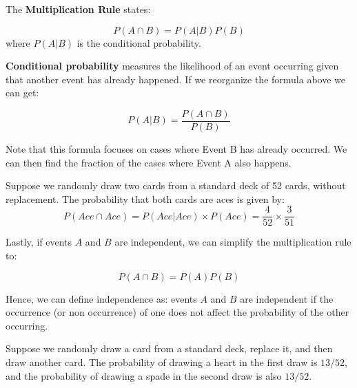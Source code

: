 \documentclass[
  11pt,
  letterpaper,
  DIV=11,
  numbers=noendperiod,
  oneside,
  open=any]{scrreprt}
\begin{document}
The \textbf{Multiplication Rule} states:

\begin{bsformula}

\[P(A \cap B)= P(A|B)P(B)\] where \(P(A|B)\) is the conditional
probability.

\end{bsformula}

\textbf{Conditional probability} measures the likelihood of an event
occurring given that another event has already happened. If we
reorganize the formula above we can get:

\begin{bsformula}

\[P(A|B)=\frac{P(A \cap B)}{P(B)}\]

\end{bsformula}

Note that this formula focuses on cases where Event B has already
occurred. We can then find the fraction of the cases where Event A also
happens.

\begin{bsexample}[Example]

Suppose we randomly draw two cards from a standard deck of 52 cards,
without replacement. The probability that both cards are aces is given
by:
\[P(Ace \cap Ace)=P(Ace|Ace) \times P(Ace)= \frac {4}{52} \times \frac{3}{51}\]

\end{bsexample}

Lastly, if events \(A\) and \(B\) are independent, we can simplify the
multiplication rule to:

\begin{bsformula}[INDEPENDENCE]

\[P(A \cap B)= P(A)P(B)\]

\end{bsformula}

Hence, we can define independence as: events \(A\) and \(B\) are
independent if the occurrence (or non occurrence) of one does not affect
the probability of the other occurring.

\begin{bsexample}[Example]

Suppose we randomly draw a card from a standard deck, replace it, and
then draw another card. The probability of drawing a heart in the first
draw is \(13/52\), and the probability of drawing a spade in the second
draw is also \(13/52\).

\end{bsexample}
\end{document}
